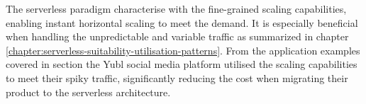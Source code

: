 The serverless paradigm characterise with the fine-grained scaling capabilities, enabling instant horizontal scaling to meet the demand. It is especially beneficial when handling the unpredictable and variable traffic as summarized in chapter \ref{chapter:serverless-suitability-utilisation-patterns}.
From the application examples covered in section \label{chapter:serverless-suitability-for-web-based-workloads} the Yubl social media platform utilised the scaling capabilities to meet their spiky traffic, significantly reducing the cost when migrating their product to the serverless architecture.








